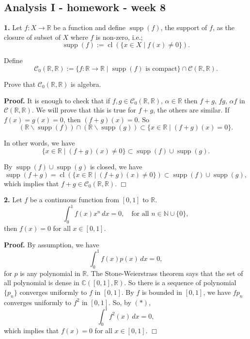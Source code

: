 \documentclass{article}
\begin{document}
    
    
    
    
    

    
    \subsection*{Analysis I - homework - week
8}\label{analysis-i---homework---week-8}

    \textbf{1.} Let $f: X\to \mathbb{R}$ be a function and define
$\operatorname{supp}(f)$, the support of $f$, as the closure of subset
of $X$ where $f$ is non-zero, i.e.;
\[ \operatorname{supp}(f) := \operatorname{cl}(\{x\in X \mid f(x) \neq 0\}).\]

Define
\[ \mathcal{C}_0(\mathbb{R},\mathbb{R}) := \{f:\mathbb{R} \to \mathbb{R} \mid \operatorname{supp}(f) \text{ is compact}\} \cap \mathcal{C}(\mathbb{R},\mathbb{R}).\]

Prove that $\mathcal{C}_0(\mathbb{R},\mathbb{R})$ is algebra.

\textbf{Proof.} It is enough to check that if
$f,g \in \mathcal{C}_0(\mathbb{R},\mathbb{R})$, $\alpha \in \mathbb{R}$
then $f+g$, $fg$, $\alpha f$ in $\mathcal{C}(\mathbb{R},\mathbb{R})$. We
will prove that this is true for $f + g$, the others are similar. If
$f(x) = g(x) = 0$, then $(f+g)(x) = 0$. So
\[(\mathbb{R} \backslash \operatorname{supp}(f))\cap (\mathbb{R} \backslash \operatorname{supp}(g)) \subset \{x \in \mathbb{R} \mid (f+g)(x) = 0\}.\]

In other words, we have
\[\{x \in \mathbb{R} \mid (f+g)(x) \ne 0\} \subset \operatorname{supp}(f) \cup \operatorname{supp}(g).\]

By $\operatorname{supp}(f) \cup \operatorname{supp}(g)$ is closed, we
have
\[\operatorname{supp}(f+g) = \operatorname{cl}(\{x \in \mathbb{R} \mid (f+g)(x) \ne 0\}) \subset  \operatorname{supp}(f) \cup \operatorname{supp}(g),\]
which implies that $f+g \in \mathcal{C}_0 (\mathbb{R},\mathbb{R})$.
$\Box$

    \textbf{2.} Let $f$ be a continuous function from $[0,1]$ to
$\mathbb{R}$.
\[\int_0^1 f(x)x^n\,dx = 0, \quad \text{for all } n \in \mathbb{N} \cup \{0\},\]
then $f(x) = 0$ for all $x\in [0,1]$.

\textbf{Proof.} By assumption, we have
\[\tag{*} \int_0^1 f(x) p(x) \,dx = 0,\] for $p$ is any polynomial in
$\mathbb{R}$. The Stone-Weierstrass theorem says that the set of all
polynomial is dense in $\mathbb{C}([0,1],\mathbb{R})$. So there is a
sequence of polynomial $\{p_n\}$ converges uniformly to $f$ in $[0,1]$.
By $f$ is bounded in $[0,1]$, we have $fp_n$ converges uniformly to
$f^2$ in $[0,1]$. So, by $(*)$, \[\int_0^1 f^2(x) \,dx = 0,\] which
implies that $f(x) = 0$ for all $x\in [0,1]$. $\Box$
\end{document}
